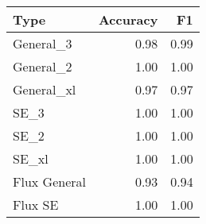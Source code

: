 \begin{tabular}{lrr}
\toprule
Type & Accuracy & F1 \\
\midrule
General_3 & 0.98 & 0.99 \\
General_2 & 1.00 & 1.00 \\
General_xl & 0.97 & 0.97 \\
SE_3 & 1.00 & 1.00 \\
SE_2 & 1.00 & 1.00 \\
SE_xl & 1.00 & 1.00 \\
Flux General & 0.93 & 0.94 \\
Flux SE & 1.00 & 1.00 \\
\bottomrule
\end{tabular}
